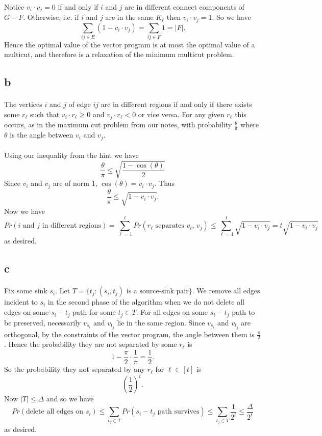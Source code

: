 \documentclass[letterpaper,12pt,oneside,onecolumn]{article}
\begin{document}
\paragraph{}
Notice $v_i\cdot v_j = 0$ if and only if $i$ and $j$ are in different connect components of $G-F$. Otherwise, i.e. if $i$ and $j$ are in the same $K_\ell$ then $v_i\cdot v_j = 1$. So we have
$$\sum_{ij\in E} (1-v_i\cdot v_j) = \sum_{ij \in F} 1 = |F|.$$
Hence the optimal value of the vector program is at most the optimal value of a multicut, and therefore is a relaxation of the minimum multicut problem.
\subsection{b}
\paragraph{}
The vertices $i$ and $j$ of edge $ij$ are in different regions if and only if there exists some $r_\ell$ such that $v_i\cdot r_\ell  \geq 0$ and $ v_j \cdot r_\ell < 0$ or vice versa. For any given $r_\ell$ this occurs, as in the maximum cut problem from our notes, with probability $\frac{\theta}{\pi}$ where $\theta$ is the angle between $v_i$ and $v_j$.
\paragraph{}
Using our inequality from the hint we have
$$\frac{\theta}{\pi} \leq \sqrt{\frac{1-\cos(\theta)}{2}}$$
Since $v_i$ and $v_j$ are of norm $1$, $\cos(\theta) = v_i\cdot v_j$. Thus
$$\frac{\theta}{\pi} \leq \sqrt{1-v_i\cdot v_j}.$$
Now we have
$$Pr(\text{$i$ and $j$ in different regions}) = \sum_{\ell = 1}^t Pr(\text{$r_\ell$ separates $v_i$, $v_j$}) \leq \sum_{\ell = 1}^t \sqrt{1-v_i\cdot v_j} = t\sqrt{1-v_i\cdot v_j}$$
as desired.
\subsection{c}
\paragraph{}
Fix some sink $s_i$. Let $T = \{t_j: (s_i,t_j) \text{ is a source-sink pair}\}$. We remove all edges incident to $s_i$ in the second phase of the algorithm when we do not delete all edges on some $s_i-t_j$ path for some $t_j \in T$. For all edges on some $s_i-t_j$ path to be preserved, necessarily $v_{s_i}$ and $v_{t_j}$ lie in the same region. Since $v_{s_i}$ and $v_{t_j}$ are orthogonal, by the constraints of the vector program, the angle between them is $\frac{\pi}{2}$. Hence the probability they are not separated by some $r_\ell$ is 
$$1- \frac{\pi}{2}\cdot \frac{1}{\pi} = \frac{1}{2}.$$
So the probability they not separated by any $r_\ell$ for $\ell \in [t]$ is
$$(\frac{1}{2})^t.$$
Now $|T| \leq \Delta$ and so we have
$$Pr(\text{delete all edges on $s_i$}) \leq \sum_{t_j \in T}Pr(\text{$s_i-t_j$ path survives}) \leq \sum_{t_j \in T}\frac{1}{2^t} \leq \frac{\Delta}{2^t}$$
as desired.
\end{document}

